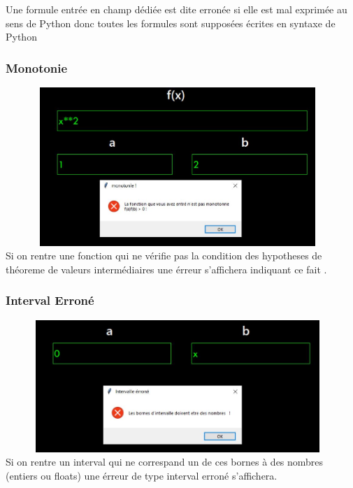 \documentclass{article}
\begin{document}
Une formule entrée en champ dédiée est dite erronée si elle est mal exprimée au sens de Python donc toutes les formules sont supposées écrites en syntaxe de Python

\subsubsection{Monotonie}
\includegraphics[width=13cm,height=6cm]{img/validation/err_fa_fb.JPG}\\

Si on rentre une fonction qui ne vérifie pas la condition des hypotheses de théoreme de valeurs intermédiaires une érreur s'affichera indiquant ce fait .

\subsubsection{Interval Erroné}
\includegraphics[width=13cm,height=5cm]{img/validation/err_interval.JPG}\\

Si on rentre un interval qui ne correspand un de ces bornes à des nombres (entiers ou floats) une érreur de type interval erroné s'affichera.
\end{document}
